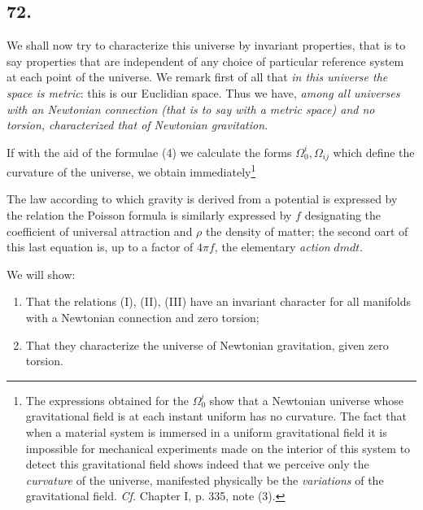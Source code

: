 \subsection*{72.}

We shall now try to characterize this universe by invariant properties, that is to say properties that are independent of any choice of particular reference system at each point of the universe. We remark first of all that \textit{in this universe the space is metric}: this is our Euclidian space. Thus we have, \textit{among all universes with an Newtonian connection (that is to say with a metric space) and no torsion, characterized that of Newtonian gravitation.}

If with the aid of the formulae (4) we calculate the forms $\Omega_0^i, \Omega_{ij}$ which define the curvature of the universe, we obtain immediately\footnote{The expressions obtained for the $\Omega_0^i$ show that a Newtonian universe whose gravitational field is at each instant uniform has no curvature. The fact that when a material system is immersed in a uniform gravitational field it is impossible for mechanical experiments made on the interior of this system to detect this gravitational field shows indeed that we perceive only the \textit{curvature} of the universe, manifested physically be the \textit{variations} of the gravitational field. \textit{Cf.} Chapter I, p. 335, note (3).}

The law according to which gravity is derived from a potential is expressed by the relation
the Poisson formula is similarly expressed by
$f$ designating the coefficient of universal attraction and $\rho$ the density of matter; the second oart of this last equation is, up to a factor of $4\pi f$, the elementary \textit{action} $dmdt$. 

We will show:

\begin{enumerate}
	\item That the relations (I), (II), (III) have an invariant character for all manifolds with a Newtonian connection and zero torsion;
	\item That they characterize the universe of Newtonian gravitation, given zero torsion.
\end{enumerate}